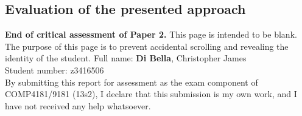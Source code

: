 \documentclass[9pt, twocolumn]{article}
\begin{document}
\subsection*{Evaluation of the presented approach}

\noindent
{\bf End of critical assessment of Paper 2.}
\clearpage
\noindent
This page is intended to be blank.\\

\noindent
The purpose of this page is to prevent accidental scrolling and revealing the identity of the student.
\clearpage
\noindent
Full name: \hspace{8mm} {\bf Di Bella}, Christopher James\\
Student number: z3416506\\

\noindent
By submitting this report for assessment as the exam component of COMP4181/9181 (13s2), I declare that this submission is my own work, and I have not received any help whatsoever.
\end{document}
